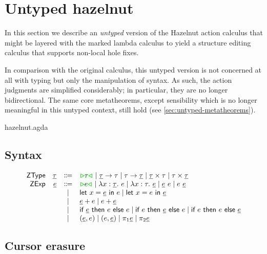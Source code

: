 \documentclass[formalism.tex]{subfiles}
\begin{document}




\section{Untyped hazelnut}
\label{sec:untyped}
In this section we describe an \emph{untyped} version of the Hazelnut action calculus that might be
layered with the marked lambda calculus to yield a structure editing calculus that supports
non-local hole fixes.

In comparison with the original calculus, this untyped version is not concerned at all with typing
but only the manipulation of syntax. As such, the action judgments are simplified considerably; in
particular, they are no longer bidirectional. The same core metatheorems, except sensibility which
is no longer meaningful in this untyped context, still hold (see \cref{sec:untyped-metatheorems}).

\begin{mechanization}
  \item hazelnut.agda
\end{mechanization}

\subsection{Syntax}
\label{sec:untyped-syntax}
\[\begin{array}{rrcl}
  \ZTMName & \ZTMV & \Coloneqq & \ZTCursor{\TMV} \mid \ZTArrowL{\ZTMV}{\TMV} \mid \ZTArrowR{\TMV}{\ZTMV} \mid \ZTProdL{\ZTMV}{\TMV} \mid \ZTProdR{\TMV}{\ZTMV} \\
  \ZMName  & \ZMV  & \Coloneqq & \ZCursor{\EMV} \mid \ZLamT{x}{\ZTMV}{\EMV} \mid \ZLamE{x}{\TMV}{\ZMV} \mid \ZApL{\ZMV}{\EMV} \mid \ZApR{\EMV}{\ZMV} \\
           &       & \mid         & \ZLetL{x}{\ZMV}{\EMV} \mid \ZLetR{x}{\EMV}{\ZMV} \\
           &       & \mid         & \ZPlusL{\ZMV}{\EMV} \mid \ZPlusR{\EMV}{\ZMV} \\
           &       & \mid         & \ZIfC{\ZMV}{\EMV}{\EMV} \mid \ZIfL{\EMV}{\ZMV}{\EMV} \mid \ZIfR{\EMV}{\EMV}{\ZMV} \\
           &       & \mid         & \ZPairL{\ZMV}{\EMV} \mid \ZPairR{\EMV}{\ZMV} \mid \ZProjL{\ZMV} \mid \ZProjR{\ZMV} \\
\end{array}\]

\subsection{Cursor erasure}
\label{sec:untyped-cursor-erasure}
\end{document}
